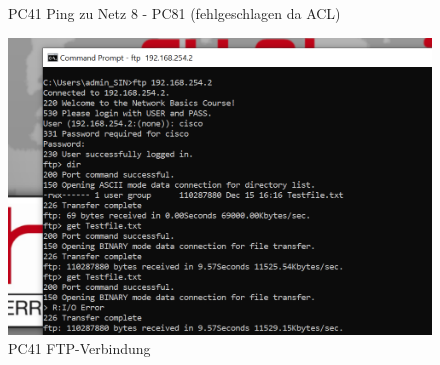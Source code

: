 \documentclass{article}
\begin{document}
\begin{figure}[!htp]
\begin{minipage}[b]{0.25\textwidth}
    \caption{PC41 Ping zu Netz 8 - PC81 (fehlgeschlagen da ACL)}
  \end{minipage}
  \hspace{0.8cm}
  \begin{minipage}[b]{0.25\textwidth}
    \includegraphics[width=\textwidth]{Arbeitsergebnisse/PC41/pc41_ftp.png}
    \caption{PC41 FTP-Verbindung}
  \end{minipage}
\end{figure}
\end{document}
